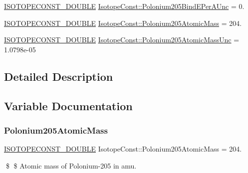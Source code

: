\begin{DoxyCompactItemize}
\mbox{\hyperlink{group___isotope_const-_macros_ga8f45a7272ce02c0b4c65c44636ed719a}{I\+S\+O\+T\+O\+P\+E\+C\+O\+N\+S\+T\+\_\+\+D\+O\+U\+B\+LE}} \mbox{\hyperlink{group___isotope_const-_polonium-_po205_gabf9976728df3fedd0647087837bb7d9b}{Isotope\+Const\+::\+Polonium205\+Bind\+E\+Per\+A\+Unc}} = 0.
\item 
\mbox{\hyperlink{group___isotope_const-_macros_ga8f45a7272ce02c0b4c65c44636ed719a}{I\+S\+O\+T\+O\+P\+E\+C\+O\+N\+S\+T\+\_\+\+D\+O\+U\+B\+LE}} \mbox{\hyperlink{group___isotope_const-_polonium-_po205_ga9a88e9e0684d63acf41245e68b9186f6}{Isotope\+Const\+::\+Polonium205\+Atomic\+Mass}} = 204.
\item 
\mbox{\hyperlink{group___isotope_const-_macros_ga8f45a7272ce02c0b4c65c44636ed719a}{I\+S\+O\+T\+O\+P\+E\+C\+O\+N\+S\+T\+\_\+\+D\+O\+U\+B\+LE}} \mbox{\hyperlink{group___isotope_const-_polonium-_po205_gad802bdce3e7b1cba06d58b093e996acf}{Isotope\+Const\+::\+Polonium205\+Atomic\+Mass\+Unc}} = 1.\+0798e-\/05
\end{DoxyCompactItemize}


\subsection{Detailed Description}


\subsection{Variable Documentation}
\mbox{\label{group___isotope_const-_polonium-_po205_ga9a88e9e0684d63acf41245e68b9186f6}} 
\subsubsection{\texorpdfstring{Polonium205\+Atomic\+Mass}{Polonium205AtomicMass}}
{\footnotesize\ttfamily \mbox{\hyperlink{group___isotope_const-_macros_ga8f45a7272ce02c0b4c65c44636ed719a}{I\+S\+O\+T\+O\+P\+E\+C\+O\+N\+S\+T\+\_\+\+D\+O\+U\+B\+LE}} Isotope\+Const\+::\+Polonium205\+Atomic\+Mass = 204.}

\$ \$ Atomic mass of Polonium-\/205 in amu. \mbox{\label{group___isotope_const-_polonium-_po205_gad802bdce3e7b1cba06d58b093e996acf}} 
